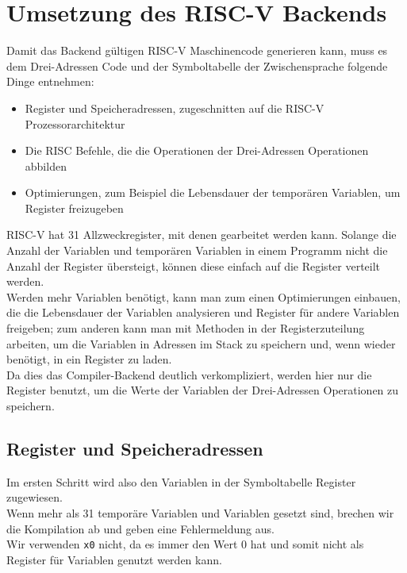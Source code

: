 \chapter{Umsetzung des RISC-V Backends}
\label{chap:build:backend}

Damit das Backend gültigen RISC-V Maschinencode generieren kann, muss es dem Drei-Adressen Code und der Symboltabelle der Zwischensprache folgende Dinge entnehmen:

\begin{itemize}
  \item{Register und Speicheradressen, zugeschnitten auf die RISC-V Prozessorarchitektur}
  \item{Die RISC Befehle, die die Operationen der Drei-Adressen Operationen abbilden}
  \item{Optimierungen, zum Beispiel die Lebensdauer der temporären Variablen, um Register freizugeben}
\end{itemize}

RISC-V hat 31 Allzweckregister, mit denen gearbeitet werden kann.
Solange die Anzahl der Variablen und temporären Variablen in einem Programm nicht die Anzahl der Register übersteigt, können diese einfach auf die Register verteilt werden.\\
Werden mehr Variablen benötigt, kann man zum einen Optimierungen einbauen, die die Lebensdauer der Variablen analysieren und Register für andere Variablen freigeben; 
zum anderen kann man mit Methoden in der Registerzuteilung arbeiten, um die Variablen in Adressen im Stack zu speichern und, wenn wieder benötigt, in ein Register zu laden.\\
Da dies das Compiler-Backend deutlich verkompliziert, werden hier nur die Register benutzt, um die Werte der Variablen der Drei-Adressen Operationen zu speichern.\\

\section{Register und Speicheradressen}

Im ersten Schritt wird also den Variablen in der Symboltabelle Register zugewiesen.\\
Wenn mehr als 31 temporäre Variablen und Variablen gesetzt sind, brechen wir die Kompilation ab und geben eine Fehlermeldung aus.\\
Wir verwenden \texttt{x0} nicht, da es immer den Wert 0 hat und somit nicht als Register für Variablen genutzt werden kann.\\

